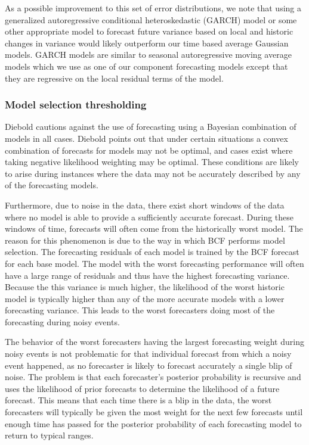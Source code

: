 As a possible improvement to this set of error distributions, we note that using a generalized autoregressive conditional heteroskedastic (GARCH) model \cite{Box2008} or some other appropriate model to forecast future variance based on local and historic changes in variance would likely outperform our time based average Gaussian models.  GARCH models are similar to seasonal autoregressive moving average models which we use as one of our component forecasting models except that they are regressive on the local residual terms of the model.

\subsubsection{Model selection thresholding}
Diebold \cite{Diebold1991} cautions against the use of forecasting using a Bayesian combination of models in all cases.  Diebold points out that under certain situations a convex combination of forecasts for models may not be optimal, and cases exist where taking negative likelihood weighting may be optimal.  These conditions are likely to arise during instances where the data may not be accurately described by any of the forecasting models.  

Furthermore, due to noise in the data, there exist short windows of the data where no model is able to provide a sufficiently accurate forecast.  During these windows of time, forecasts will often come from the historically worst model.  The reason for this phenomenon is due to the way in which BCF performs model selection.  The forecasting residuals of each model is trained by the BCF forecast for each base model.  The model with the worst forecasting performance will often have a large range of residuals and thus have the highest forecasting variance.  Because the this variance is much higher, the likelihood of the worst historic model is typically higher than any of the more accurate models with a  lower forecasting variance.  This leads to the worst forecasters doing most of the forecasting during noisy events.  

The behavior of the worst forecasters having the largest forecasting weight during noisy events is not problematic for that individual forecast from which a noisy event happened, as no forecaster is likely to forecast accurately a single blip of noise.  The problem is that each forecaster's posterior probability is recursive and uses the likelihood of prior forecasts to determine the likelihood of a future forecast.  This means that each time there is a blip in the data, the worst forecasters will typically be given the most weight for the next few forecasts until enough time has passed for the posterior probability of each forecasting model to return to typical ranges.

